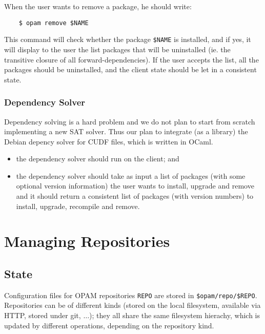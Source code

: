 \documentclass[a4paper,11pt]{article}
\begin{document}
When the user wants to remove a package, he should write:

\begin{verbatim}
    $ opam remove $NAME
\end{verbatim}

This command will check whether the package \verb+$NAME+ is installed,
and if yes, it will display to the user the list packages that will be
uninstalled (ie. the transitive closure of all forward-dependencies).
If the user accepts the list, all the packages should be uninstalled,
and the client state should be let in a consistent state.

\subsubsection{Dependency Solver}
\label{deps}

Dependency solving is a hard problem and we do not plan to start from
scratch implementing a new SAT solver. Thus our plan to integrate (as
a library) the Debian depency solver for CUDF files, which is written
in OCaml.

\begin{itemize}
\item the dependency solver should run on the client; and
\item the dependency solver should take as input a list of packages
  (with some optional version information) the user wants to install,
  upgrade and remove and it should return a consistent list of
  packages (with version numbers) to install, upgrade, recompile and
  remove.
\end{itemize}

\section{Managing Repositories}
\label{section:repositories}

\subsection{State}
\label{state-repo}

Configuration files for OPAM repositories \verb+REPO+ are stored in
\verb+$opam/repo/$REPO+. Repositories can be of different kinds
(stored on the local filesystem, available via HTTP, stored under git,
$\ldots$); they all share the same filesystem hierachy, which is
updated by different operations, depending on the repository kind.
\end{document}
